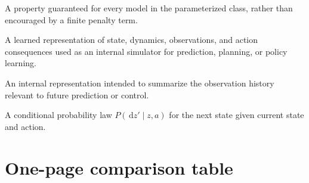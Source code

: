 \documentclass[11pt]{article}
\newcommand{\dd}{\,\mathrm{d}}
\begin{document}
\begin{description}[style=nextline,leftmargin=1.5em,labelsep=0.5em]
\item[Hard constraint]
A property guaranteed for every model in the parameterized class, rather than encouraged by a finite penalty term.

\item[World model]
A learned representation of state, dynamics, observations, and action consequences used as an internal simulator for prediction, planning, or policy learning.

\item[Latent state]
An internal representation intended to summarize the observation history relevant to future prediction or control.

\item[Transition kernel]
A conditional probability law \(P(\dd z'\mid z,a)\) for the next state given current state and action.
\end{description}

\section{One-page comparison table}
\end{document}
